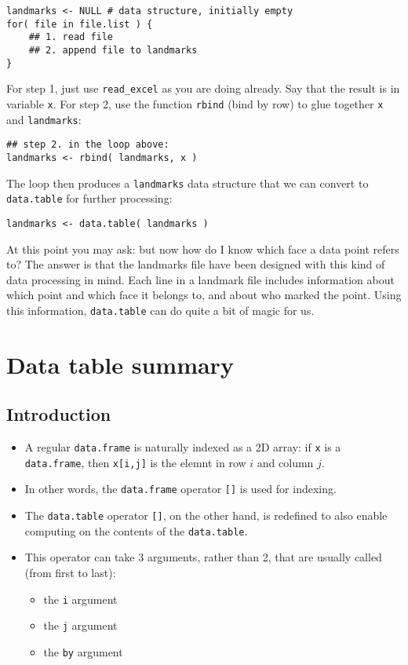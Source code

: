 \documentclass[11pt]{article}
\begin{document}
\lstset{language=R,label= ,caption= ,numbers=none}
\begin{lstlisting}
landmarks <- NULL # data structure, initially empty
for( file in file.list ) {
    ## 1. read file
    ## 2. append file to landmarks
}
\end{lstlisting}

For step 1, just use \verb~read_excel~ as you are doing already. Say that
the result is in variable \verb~x~. For step 2, use the function \verb~rbind~
(bind by row) to glue together \verb~x~ and \verb~landmarks~:

\lstset{language=R,label= ,caption= ,numbers=none}
\begin{lstlisting}
## step 2. in the loop above:
landmarks <- rbind( landmarks, x )
\end{lstlisting}

The loop then produces a \verb~landmarks~ data structure that we can
convert to \verb~data.table~ for further processing:

\lstset{language=R,label= ,caption= ,numbers=none}
\begin{lstlisting}
landmarks <- data.table( landmarks )
\end{lstlisting}

At this point you may ask: but now how do I know which face a data
point refers to? The answer is that the landmarks file have been
designed with this kind of data processing in mind. Each line in a
landmark file includes information about which point and which face it
belongs to, and about who marked the point. Using this information,
\verb~data.table~ can do quite a bit of magic for us. 

\section*{Data table summary}
\label{sec-2}

\subsection*{Introduction}
\label{sec-2-1}

\begin{itemize}
\item A regular \verb~data.frame~ is naturally indexed as a 2D array: if \verb~x~ is
a \verb~data.frame~, then \verb~x[i,j]~ is the elemnt in row $i$ and column
$j$.
\item In other words, the \verb~data.frame~ operator \verb~[]~ is used for indexing.
\item The \verb~data.table~ operator \verb~[]~, on the other hand, is redefined to
also enable computing on the contents of the \verb~data.table~.
\item This operator can take 3 arguments, rather than 2, that are usually
called (from first to last):
\begin{itemize}
\item the \verb~i~ argument
\item the \verb~j~ argument
\item the \verb~by~ argument
\end{itemize}
\end{itemize}
\end{document}
